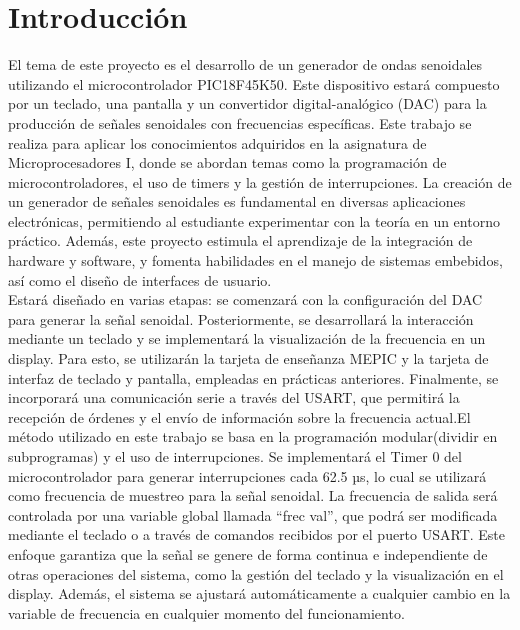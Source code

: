 \section{Introducción}

El tema de este proyecto es el desarrollo de un generador de ondas senoidales utilizando el microcontrolador PIC18F45K50. Este dispositivo estará compuesto por un teclado, una pantalla y un convertidor digital-analógico (DAC) para la producción de señales senoidales con frecuencias específicas. Este trabajo se realiza para aplicar los conocimientos adquiridos en la asignatura de Microprocesadores I, donde se abordan temas como la programación de microcontroladores, el uso de timers y la gestión de interrupciones. La creación de un generador de señales senoidales es fundamental en diversas aplicaciones electrónicas, permitiendo al estudiante experimentar con la teoría en un entorno práctico. Además, este proyecto estimula el aprendizaje de la integración de hardware y software, y fomenta habilidades en el manejo de sistemas embebidos, así como el diseño de interfaces de usuario.\\

Estará diseñado en varias etapas: se comenzará con la configuración del DAC para generar la señal senoidal. Posteriormente, se desarrollará la interacción mediante un teclado y se implementará la visualización de la frecuencia en un display. Para esto, se utilizarán la tarjeta de enseñanza MEPIC y la tarjeta de interfaz de teclado y pantalla, empleadas en prácticas anteriores. Finalmente, se incorporará una comunicación serie a través del USART, que permitirá la recepción de órdenes y el envío de información sobre la frecuencia actual.El método utilizado en este trabajo se basa en la programación modular(dividir en subprogramas) y el uso de interrupciones. Se implementará el Timer 0 del microcontrolador para generar interrupciones cada 62.5 µs, lo cual se utilizará como frecuencia de muestreo para la señal senoidal. La frecuencia de salida será controlada por una variable global llamada “frec val”, que podrá ser modificada mediante el teclado o a través de comandos recibidos por el puerto USART. Este enfoque garantiza que la señal se genere de forma continua e independiente de otras operaciones del sistema, como la gestión del teclado y la visualización en el display. Además, el sistema se ajustará automáticamente a cualquier cambio en la variable de frecuencia en cualquier momento del funcionamiento.